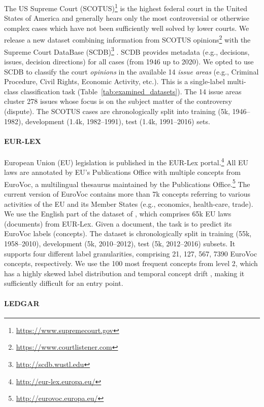 \documentclass[11pt]{article}
\begin{document}
The US Supreme Court  (SCOTUS)\footnote{\url{https://www.supremecourt.gov}} is the highest federal court in the United States of America and generally hears only the most controversial or otherwise complex cases which have not been sufficiently well solved by lower courts. We release a new dataset combining information from SCOTUS opinions\footnote{\url{https://www.courtlistener.com}} with the Supreme Court DataBase (SCDB)\footnote{\url{http://scdb.wustl.edu}} \cite{spaeth2020}. SCDB provides metadata (e.g., decisions, issues, decision directions) for all cases (from 1946 up to 2020).
We opted to use SCDB to classify the court  \emph{opinions} in the available 14  \emph{issue areas} (e.g., Criminal Procedure, Civil Rights, Economic Activity, etc.). This is a single-label multi-class classification task (Table~\ref{tab:examined_datasets}). The 14 issue areas cluster 278 issues whose focus is on the subject matter of the controversy (dispute). The SCOTUS cases are chronologically split into training (5k, 1946--1982), development (1.4k, 1982--1991), test (1.4k, 1991--2016) sets.
\vspace{-1mm}

\paragraph{EUR-LEX} European Union (EU) legislation is published in the EUR-Lex portal.\footnote{\url{http://eur-lex.europa.eu/}} All EU laws are annotated by EU's Publications Office with multiple concepts from EuroVoc, a multilingual thesaurus maintained by the Publications Office.\footnote{\url{http://eurovoc.europa.eu/}} 
The current version of EuroVoc contains more than 7k concepts referring to various activities of the EU and its Member States (e.g., economics, health-care, trade). 
We use the English part of the dataset of \citet{chalkidis2021-multieurlex}, which comprises 65k EU laws (documents) from EUR-Lex. Given a document, the task is to predict its EuroVoc labels (concepts).
The dataset is chronologically split in training (55k, 1958--2010), development (5k, 2010--2012), test (5k, 2012--2016) subsets. It supports four different label granularities,  comprising 21, 127, 567, 7390 EuroVoc concepts, respectively. 
We use the 100 most frequent concepts from level 2, which has a highly skewed label distribution and temporal concept drift \cite{chalkidis2021-multieurlex}, making it sufficiently difficult for an entry point.   

\paragraph{LEDGAR}
\end{document}
